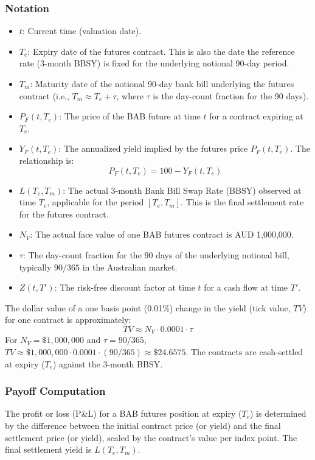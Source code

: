 \documentclass[11pt, a4paper, british]{article}
\begin{document}
\subsubsection{Notation}
\begin{itemize}
 \item $t$: Current time (valuation date).
 \item $T_e$: Expiry date of the futures contract. This is also the date the reference rate (3-month BBSY) is fixed for the underlying notional 90-day period.
 \item $T_m$: Maturity date of the notional 90-day bank bill underlying the futures contract (i.e., $T_m \approx T_e + \tau$, where $\tau$ is the day-count fraction for the 90 days).
 \item $P_F(t, T_e)$: The price of the BAB future at time $t$ for a contract expiring at $T_e$.
 \item $Y_F(t, T_e)$: The annualized yield implied by the futures price $P_F(t, T_e)$. The relationship is:
 \begin{equation}
 P_F(t, T_e) = 100 - Y_F(t, T_e)
 \end{equation}
 \item $L(T_e, T_m)$: The actual 3-month Bank Bill Swap Rate (BBSY) observed at time $T_e$, applicable for the period $[T_e, T_m]$. This is the final settlement rate for the futures contract.
 \item $N_V$: The actual face value of one BAB futures contract is AUD 1,000,000.
 \item $\tau$: The day-count fraction for the 90 days of the underlying notional bill, typically $90/365$ in the Australian market.
 \item $Z(t, T')$: The risk-free discount factor at time $t$ for a cash flow at time $T'$.
\end{itemize}

The dollar value of a one basis point (0.01\%) change in the yield (tick value, $TV$) for one contract is approximately:
\begin{equation}
 TV \approx N_V \cdot 0.0001 \cdot \tau
\end{equation}
For $N_V = \$1,000,000$ and $\tau = 90/365$, $TV \approx \$1,000,000 \cdot 0.0001 \cdot (90/365) \approx \$24.6575$.
The contracts are cash-settled at expiry ($T_e$) against the 3-month BBSY.

\subsubsection{Payoff Computation}
The profit or loss (P\&L) for a BAB futures position at expiry ($T_e$) is determined by the difference between the initial contract price (or yield) and the final settlement price (or yield), scaled by the contract's value per index point. The final settlement yield is $L(T_e, T_m)$.
\end{document}
